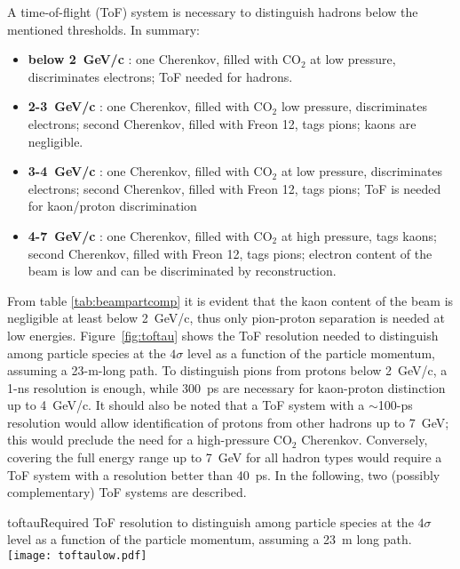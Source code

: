 A time-of-flight (ToF) system  is  necessary   to distinguish hadrons below the mentioned thresholds.
%
In summary:
\begin{itemize}
\item {\bf below 2~GeV/c} : one Cherenkov, filled with CO$_2$ at low
  pressure, discriminates electrons; ToF needed for hadrons.
\item {\bf 2-3~GeV/c} : one Cherenkov, filled with CO$_2$ low
  pressure, discriminates electrons; second Cherenkov, filled with
  Freon 12, tags pions; kaons are negligible.
\item {\bf 3-4~GeV/c} : one Cherenkov, filled with CO$_2$ at low
  pressure, discriminates electrons; second  Cherenkov, filled with
  Freon 12, tags pions; ToF is needed for kaon/proton discrimination
\item {\bf 4-7~GeV/c} : one Cherenkov, filled with CO$_2$ at high
  pressure, tags kaons; second  Cherenkov, filled with
  Freon 12, tags pions; electron content of the beam is low and can be
  discriminated by reconstruction.
\end{itemize}

  From table \ref{tab:beampartcomp} it is evident that the kaon content of the beam is negligible at least below 2~GeV/c, thus  only pion-proton separation is needed at low energies. Figure~\ref{fig:toftau} shows the ToF resolution needed to distinguish among particle species at the $4\sigma$ level as a function of the particle momentum, assuming a 23-m-long path. To distinguish pions from protons below 2~GeV/c, a 1-ns resolution is enough, while 300~ps are necessary for kaon-proton distinction up to  4~GeV/c. It should also be noted that a ToF system with a $\sim$100-ps resolution would allow identification of protons from other hadrons up to 7~GeV; this would preclude the need for a %
  high-pressure CO$_2$ Cherenkov. %
  Conversely, covering %
  the full energy range up to 7~GeV for all hadron  types would require a ToF system with a resolution better than 40~ps. %
In the following, two (possibly complementary) ToF systems are described.
\begin{cdrfigure}{toftau}{Required ToF resolution to  distinguish among particle species at the $4\sigma$ level as a function of the particle momentum, assuming a 23~m long path. }
\texttt{[image: toftaulow.pdf]}
\end{cdrfigure}

